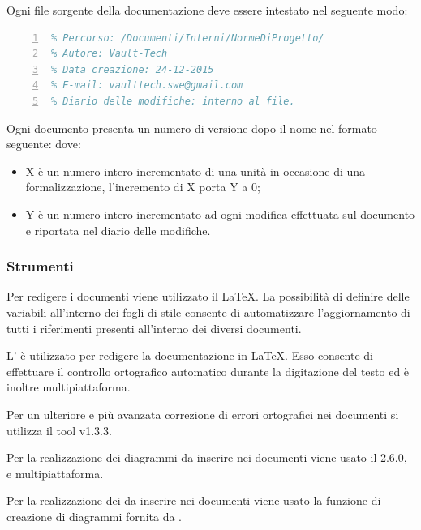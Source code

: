 \documentclass[a4paper, titlepage]{article}
\begin{document}
Ogni file sorgente della documentazione deve essere intestato nel seguente modo:
\begin{lstlisting}[language=TeX,numbers=left]
% Nome del file: NormeDiProgetto.tex
% Percorso: /Documenti/Interni/NormeDiProgetto/
% Autore: Vault-Tech
% Data creazione: 24-12-2015
% E-mail: vaulttech.swe@gmail.com
% Diario delle modifiche: interno al file.
\end{lstlisting}

Ogni documento presenta un numero di versione dopo il nome nel formato seguente:
dove:
\begin{itemize}
	\item X è un numero intero incrementato di una unità in occasione di una formalizzazione, l'incremento di X porta Y a 0;
	\item Y è un numero intero incrementato ad ogni modifica effettuata sul documento e riportata nel diario delle modifiche.
\end{itemize}

\subsubsection{Strumenti}

\myparagraph{\LaTeX}
Per redigere i documenti viene utilizzato il  \LaTeX. La possibilità di definire delle variabili all'interno dei fogli di stile consente di automatizzare l'aggiornamento di tutti i riferimenti presenti all'interno dei diversi documenti.

L'  è utilizzato per redigere la documentazione in  \LaTeX. Esso consente di effettuare il controllo ortografico automatico durante la digitazione del testo ed è inoltre multipiattaforma.

Per un ulteriore e più avanzata correzione di errori ortografici nei documenti si utilizza il tool  v1.3.3.

Per la realizzazione dei diagrammi  da inserire nei documenti viene usato il   2.6.0,  e multipiattaforma.

Per la realizzazione dei  da inserire nei documenti viene usato la funzione di creazione di diagrammi fornita da . 
\end{document}
